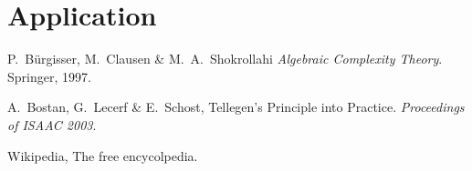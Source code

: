 \documentclass{article}
\begin{document}
  \section{Application}


  
  \begin{thebibliography}{1}
    
  P.~Bürgisser, M.~Clausen \& M.~A.~Shokrollahi
    \emph{Algebraic Complexity Theory}.
    Springer, 1997.
    
  A.~Bostan, G.~Lecerf \& E.~Schost,
    Tellegen's Principle into Practice.
    \emph{Proceedings of ISAAC 2003}.

  Wikipedia, The free encycolpedia.
  
  \end{thebibliography}
\end{document}
